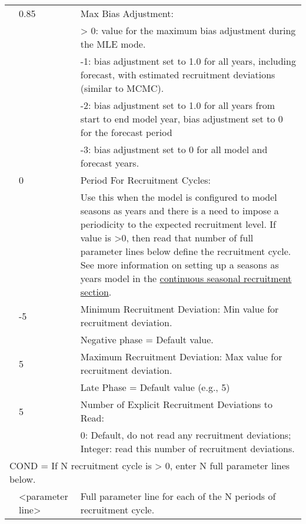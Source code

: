 \begin{longtable}{p{1cm} p{3cm} p{11cm}}
	\Tstrut & 0.85 & Max Bias Adjustment: \\
			&	   & > 0: value for the maximum bias adjustment during the MLE mode. \\
			& 	   & -1: bias adjustment set to 1.0 for all years, including forecast, with estimated recruitment deviations (similar to MCMC). \\
			& 	   & -2: bias adjustment set to 1.0 for all years from start to end model year, bias adjustment set to 0 for the forecast period \\
			& 	   & -3: bias adjustment set to 0 for all model and forecast years. \\

	\Tstrut & 0    & Period For Recruitment Cycles: \\
			&      & Use this when the model is configured to model seasons as years and there is a need to impose a periodicity to the expected recruitment level. If value is >0, then read that number of full parameter lines below define the recruitment cycle. See more information on setting up a seasons as years model in the \hyperlink{continuous-seasonal-recruitment-sec}{continuous seasonal recruitment section}. \\
	
	\Tstrut & -5   & Minimum Recruitment Deviation: Min value for recruitment deviation. \\
			&	   & Negative phase = Default value. \\

	\Tstrut & 5	   & Maximum Recruitment Deviation: Max value for recruitment deviation. \\
			&	   & Late Phase = Default value (e.g., 5) \\
	
	\Tstrut & 5   & Number of Explicit Recruitment Deviations to Read: \\
			&      & 0: Default, do not read any recruitment deviations; Integer: read this number of recruitment deviations. \\

	\multicolumn{3}{l}{COND = If N recruitment cycle is > 0, enter N full parameter lines below.} \Tstrut\\
	\Tstrut & <parameter line> & Full parameter line for each of the N periods of recruitment cycle. \Bstrut\\
	\hline


\end{longtable}
